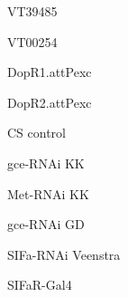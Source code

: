 \documentclass[17pt]{extarticle}
\begin{document}
\footnotesize
\newpage\vspace*{-0.15cm}
\begin{large}
VT39485 \\[0.5em]
\end{large}
\footnotesize
\newpage\vspace*{-0.15cm}
\begin{large}
VT00254 \\[0.5em]
\end{large}
\footnotesize
\newpage\vspace*{-0.15cm}
\begin{normalsize}
DopR1.attPexc \\[0.5em]
\end{normalsize}
\footnotesize
\newpage\vspace*{-0.15cm}
\begin{normalsize}
DopR2.attPexc \\[0.5em]
\end{normalsize}
\footnotesize
\newpage\vspace*{-0.15cm}
\begin{large}
CS control \\[0.5em]
\end{large}
\footnotesize
\newpage\vspace*{-0.15cm}
\begin{normalsize}
gce-RNAi KK \\[0.5em]
\end{normalsize}
\footnotesize
\newpage\vspace*{-0.15cm}
\begin{normalsize}
Met-RNAi KK \\[0.5em]
\end{normalsize}
\footnotesize
\newpage\vspace*{-0.15cm}
\begin{normalsize}
gce-RNAi GD \\[0.5em]
\end{normalsize}
\footnotesize
\newpage\vspace*{-0.15cm}
\begin{footnotesize}
SIFa-RNAi Veenstra \\[0.5em]
\end{footnotesize}
\footnotesize
\newpage\vspace*{-0.15cm}
\begin{large}
SIFaR-Gal4 \\[0.5em]
\end{large}
\footnotesize
\newpage\vspace*{-0.15cm}
\end{document}
